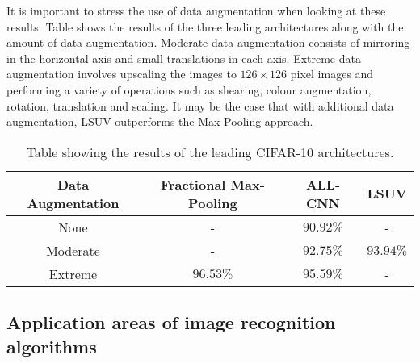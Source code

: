 It is important to stress the use of data augmentation when looking at these results. Table \label{tab:SOA_res} shows the results of the three leading architectures along with the amount of data augmentation. Moderate data augmentation consists of mirroring in the horizontal axis and small translations in each axis. Extreme data augmentation involves upscaling the images to $126\times126$ pixel images and performing a variety of operations such as shearing, colour augmentation, rotation, translation and scaling. It may be the case that with additional data augmentation, LSUV outperforms the Max-Pooling approach.

\begin{table}[h]
\begin{center}
 \begin{tabular}{||c || c c c||}
 \hline
 Data Augmentation & Fractional Max-Pooling & ALL-CNN & LSUV \\ [0.5ex]
 \hline\hline
 None & - & $90.92\%$ & - \\
 \hline
 Moderate & - & $92.75\%$ & $93.94\%$\\
 \hline
 Extreme & $96.53\%$ & $95.59\%$ & - \\ [1ex]
 \hline

\end{tabular}
\caption{Table showing the results of the leading CIFAR-10 architectures.}
\end{center}
\end{table}


\subsection{Application areas of image recognition algorithms}
